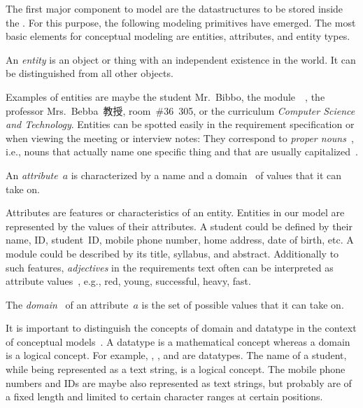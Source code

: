 %
%
\label{sec:entitisAttrsErd}%
\xdef\conceptualSchemaEntitiesAndAttributesDir{\currentDir}%
%
The first major component to model are the datastructures to be stored inside the \db.
For this purpose, the following modeling primitives have emerged.
The most basic elements for conceptual modeling are entities, attributes, and entity types.%
%
\begin{definition}[Entity]%
\label{def:entity}%
An \emph{entity} is an object or thing with an independent existence in the world. %
It can be distinguished from all other objects.%
\end{definition}%
%
Examples of entities are maybe the student Mr.~Bibbo, the module~~\cite{programmingWithPython}, the professor Mrs.~Bebba~教授, room~\#36~305, or the curriculum \emph{Computer Science and Technology}.
Entities can be spotted easily in the requirement specification or when viewing the meeting or interview notes:
They correspond to \emph{proper nouns}~\cite{C1997ECAED}, i.e., nouns that actually name one specific thing and that are usually capitalized~\cite{EOWM2025MWAMTD:CAPNWTDLWOGC}.%
%
\begin{definition}[Attribute]%
\label{def:attribute}%
An \emph{attribute}~$a$ is characterized by a name and a domain~ of values that it can take on.%
\end{definition}%
%
Attributes are features or characteristics of an entity.
Entities in our model are represented by the values of their attributes.
A student could be defined by their name, ID, student~ID, mobile phone number, home address, date of birth, etc.
A module could be described by its title, syllabus, and abstract.
Additionally to such features, \emph{adjectives} in the requirements text often can be interpreted as attribute values~\cite{C1997ECAED}, e.g., red, young, successful, heavy, fast.%
%
\begin{definition}[Domain]%
\label{def:attributeDomain}%
The \emph{domain}~ of an attribute~$a$ is the set of possible values that it can take on.%
\end{definition}%
%
It is important to distinguish the concepts of domain and datatype in the context of conceptual models~\cite{S2024D:LDMRMRA}.
A datatype is a mathematical concept whereas a domain is a logical concept.
For example, , , and  are datatypes.
The name of a student, while being represented as a text string, is a logical concept.
The mobile phone numbers and IDs are maybe also represented as text strings, but probably are of a fixed length and limited to certain character ranges at certain positions.

